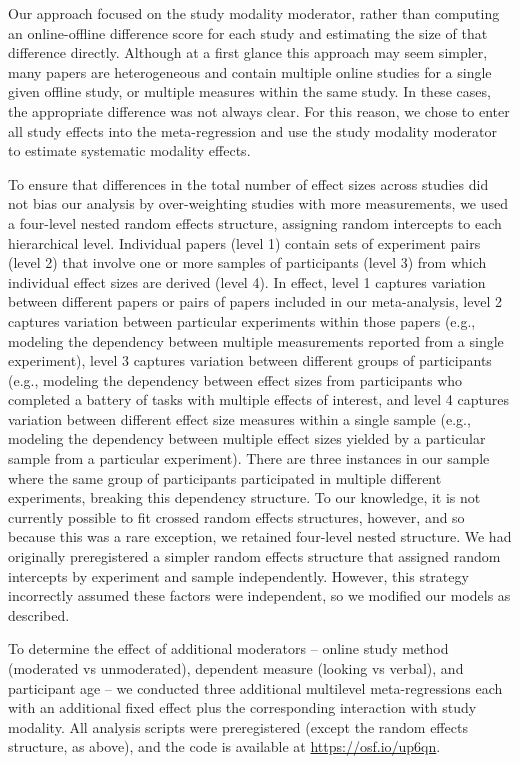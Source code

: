 \documentclass[
  man,floatsintext]{apa6}
\begin{document}
Our approach focused on the study modality moderator, rather than computing an online-offline difference score for each study and estimating the size of that difference directly. Although at a first glance this approach may seem simpler, many papers are heterogeneous and contain multiple online studies for a single given offline study, or multiple measures within the same study. In these cases, the appropriate difference was not always clear. For this reason, we chose to enter all study effects into the meta-regression and use the study modality moderator to estimate systematic modality effects.

To ensure that differences in the total number of effect sizes across studies did not bias our analysis by over-weighting studies with more measurements, we used a four-level nested random effects structure, assigning random intercepts to each hierarchical level. Individual papers (level 1) contain sets of experiment pairs (level 2) that involve one or more samples of participants (level 3) from which individual effect sizes are derived (level 4). In effect, level 1 captures variation between different papers or pairs of papers included in our meta-analysis, level 2 captures variation between particular experiments within those papers (e.g., modeling the dependency between multiple measurements reported from a single experiment), level 3 captures variation between different groups of participants (e.g., modeling the dependency between effect sizes from participants who completed a battery of tasks with multiple effects of interest, and level 4 captures variation between different effect size measures within a single sample (e.g., modeling the dependency between multiple effect sizes yielded by a particular sample from a particular experiment). There are three instances in our sample where the same group of participants participated in multiple different experiments, breaking this dependency structure. To our knowledge, it is not currently possible to fit crossed random effects structures, however, and so because this was a rare exception, we retained four-level nested structure. We had originally preregistered a simpler random effects structure that assigned random intercepts by experiment and sample independently. However, this strategy incorrectly assumed these factors were independent, so we modified our models as described.

To determine the effect of additional moderators -- online study method (moderated vs unmoderated), dependent measure (looking vs verbal), and participant age -- we conducted three additional multilevel meta-regressions each with an additional fixed effect plus the corresponding interaction with study modality. All analysis scripts were preregistered (except the random effects structure, as above), and the code is available at \href{}{https://osf.io/up6qn}.
\end{document}
